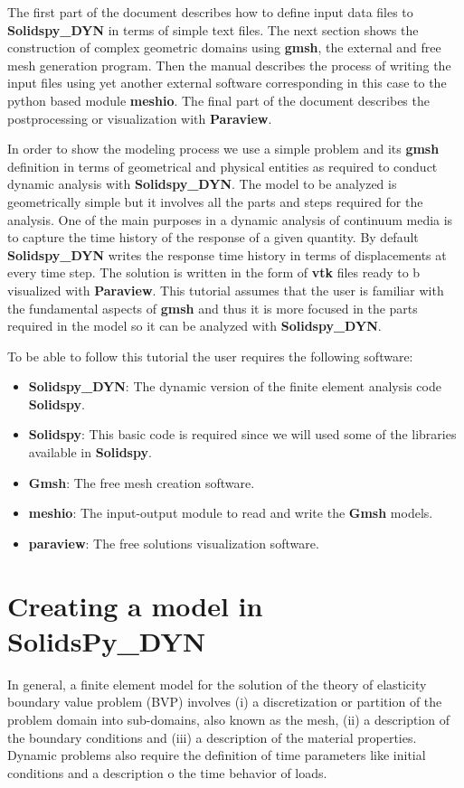 \documentclass[11pt,letterpaper]{article}
\begin{document}
The first part of the document describes how to define input data files to {\bf Solidspy\_DYN} in terms of simple text files. The next section shows the construction of complex geometric domains using {\bf gmsh}, the external and free mesh generation program. Then the manual describes the process of writing the input files using yet another external software corresponding in this case to the python based module {\bf meshio}. The final part of the document describes the postprocessing or visualization with {\bf Paraview}. 


In order to show the modeling process we use a simple problem and its {\bf gmsh} definition in terms of geometrical and physical entities as required to conduct dynamic analysis with {\bf Solidspy\_DYN}. The model to be analyzed is geometrically simple but it involves all the parts and steps required for the analysis. One of the main purposes in a dynamic analysis of continuum media is to capture the time history of the response of a given quantity. By default {\bf Solidspy\_DYN} writes the response time history in terms of displacements at every time step. The solution is written in the form of {\bf vtk} files ready to b visualized with {\bf Paraview}. This tutorial assumes that the user is familiar with the fundamental aspects of {\bf gmsh} and thus it is more focused in the parts required in the model so it can be analyzed with {\bf Solidspy\_DYN}.

To be able to follow this tutorial the user requires the following software:

\begin{itemize}
\item {\bf Solidspy\_DYN}: The dynamic version of the finite element analysis code {\bf Solidspy}.
\item {\bf Solidspy}: This basic code is required since we will used some of the libraries available in {\bf Solidspy}.
\item {\bf Gmsh}: The free mesh creation software.
\item {\bf meshio}: The input-output module to read and write the {\bf Gmsh} models.
\item {\bf paraview}: The free solutions visualization software. 
\end{itemize}

\section{Creating a model in SolidsPy\_DYN }
In general, a finite element model for the solution of the theory of elasticity boundary value problem (BVP) involves (i) a discretization or partition of the problem domain into sub-domains, also known as the mesh, (ii) a description of the boundary conditions and (iii) a description of the material properties. Dynamic problems also require the definition of time parameters like initial conditions and a description o the time behavior of loads.
\end{document}
